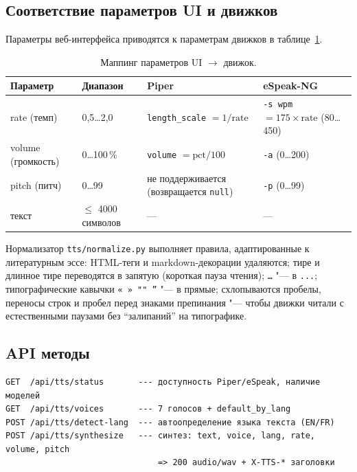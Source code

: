 \subsection{Соответствие параметров UI и движков}

Параметры веб-интерфейса приводятся к параметрам движков
в таблице~\ref{tab:tts_params}.

\begin{table}[H]
	\caption{Маппинг параметров UI $\to$ движок.}
	\label{tab:tts_params}
	\begin{tabular}{|p{}|p{}|p{}|p{}|}
		\hline
		Параметр & Диапазон & Piper & eSpeak-NG \\ \hline
		rate (темп) & 0,5…2,0 & \texttt{length\_scale} $= 1/\mathrm{rate}$ &
			\texttt{-s wpm} $= 175 \times \mathrm{rate}$ (80…450) \\
		volume (громкость) & 0…100\,\% & \texttt{volume} $= \mathrm{pct}/100$ &
			\texttt{-a} (0…200) \\
		pitch (питч) & 0…99 & не поддерживается (возвращается \texttt{null}) &
			\texttt{-p} (0…99) \\
		текст & $\le$ 4000 символов & --- & --- \\ \hline
	\end{tabular}
\end{table}

Нормализатор \texttt{tts/normalize.py} выполняет правила,
адаптированные к литературным эссе: HTML-теги и markdown-декорации удаляются;
тире и длинное тире переводятся в запятую (короткая пауза чтения);
\texttt{…} "--- в \texttt{...}; типографические кавычки
\texttt{« » "" ''} "--- в прямые; схлопываются пробелы, переносы строк
и пробел перед знаками препинания "--- чтобы движки читали с естественными
паузами без ``залипаний'' на типографике.

\subsection{API методы}

\begin{lstlisting}[caption={HTTP эндпоинты подсистемы синтеза речи.},label={lst:tts_api}]
GET  /api/tts/status       --- доступность Piper/eSpeak, наличие моделей
GET  /api/tts/voices       --- 7 голосов + default_by_lang
POST /api/tts/detect-lang  --- автоопределение языка текста (EN/FR)
POST /api/tts/synthesize   --- синтез: text, voice, lang, rate, volume, pitch
                               => 200 audio/wav + X-TTS-* заголовки
\end{lstlisting}

